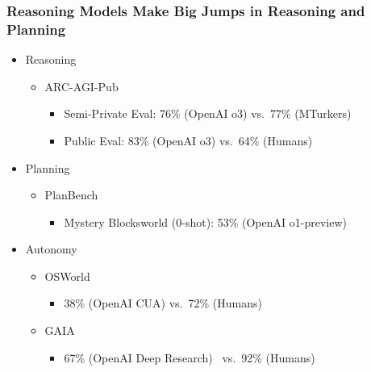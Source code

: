 \documentclass[aspectratio=169]{beamer}
\begin{document}
    \begin{frame}
        \frametitle{Reasoning Models Make Big Jumps in Reasoning and Planning}
        \begin{itemize}
            \item Reasoning
            \begin{itemize}
                \item ARC-AGI-Pub~\parencite{chollet_o3_2024}
                \begin{itemize}
                    \item Semi-Private Eval: \alert{76\% (OpenAI o3)} vs.\ 77\% (MTurkers)
                    \item Public Eval: \alert{83\% (OpenAI o3)} vs.\ 64\% (Humans)~\parencite{legris2024harcrobustestimatehuman}
                \end{itemize}
            \end{itemize}
            \item Planning
            \begin{itemize}
                \item PlanBench~\parencite{valmeekam2024llmscantplanlrms}
                \begin{itemize}
                    \item Mystery Blocksworld (0-shot): \alert{53\% (OpenAI o1-preview)}
                \end{itemize}
            \end{itemize}
            \item Autonomy
            \begin{itemize}
                \item OSWorld~\parencite{OSWorld}
                \begin{itemize}
                    \item 38\% (OpenAI CUA) vs.\ 72\% (Humans)
                \end{itemize}
                \item GAIA~\parencite{mialon2023gaia}
                \begin{itemize}
                    \item 67\% (OpenAI Deep Research)~\parencite{openai_deep_research_2025} vs.\ 92\% (Humans)
                \end{itemize}
            \end{itemize}
        \end{itemize}
    \end{frame}
\end{document}

